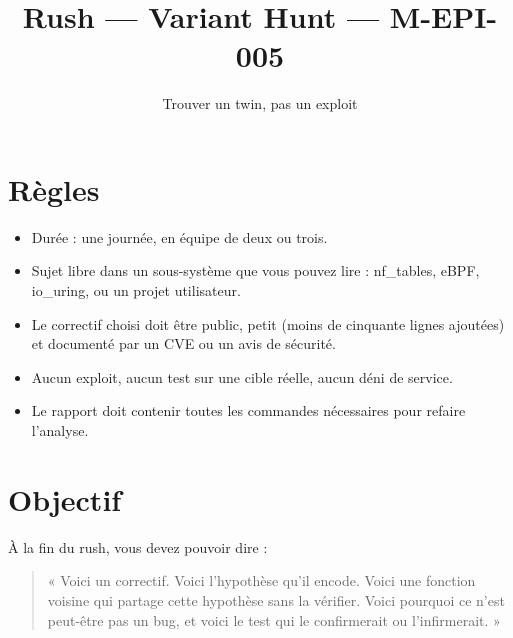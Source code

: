 \documentclass{training}
\begin{document}
\title{Rush --- Variant Hunt --- M-EPI-005}
\subtitle{Trouver un twin, pas un exploit}
\maketitle

\newpage
\tableofcontents
\newpage

\chapter{Règles}

\begin{itemize}
  \item Durée : une journée, en équipe de deux ou trois.
  \item Sujet libre dans un sous-système que vous pouvez lire : nf\_tables,
        eBPF, io\_uring, ou un projet utilisateur.
  \item Le correctif choisi doit être public, petit (moins de cinquante
        lignes ajoutées) et documenté par un CVE ou un avis de sécurité.
  \item Aucun exploit, aucun test sur une cible réelle, aucun déni de
        service.
  \item Le rapport doit contenir toutes les commandes nécessaires pour
        refaire l'analyse.
\end{itemize}





\chapter{Objectif}

À la fin du rush, vous devez pouvoir dire :

\begin{quote}
« Voici un correctif. Voici l'hypothèse qu'il encode. Voici une fonction
voisine qui partage cette hypothèse sans la vérifier. Voici pourquoi ce
n'est peut-être pas un bug, et voici le test qui le confirmerait ou
l'infirmerait. »
\end{quote}
\end{document}
